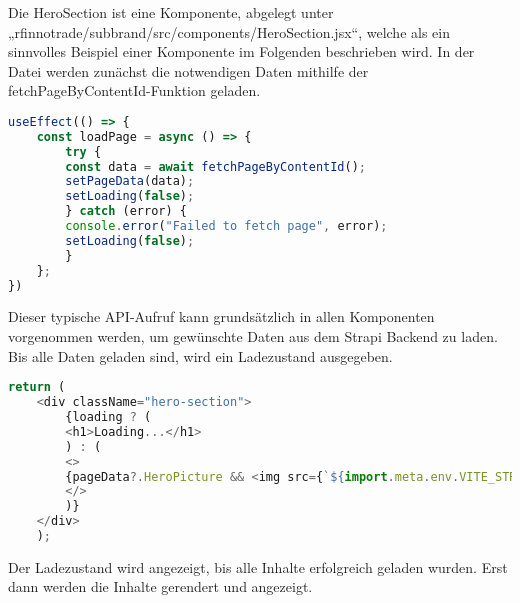 Die HeroSection ist eine Komponente, abgelegt unter „rfinnotrade/subbrand/src/components/HeroSection.jsx“, welche als ein sinnvolles Beispiel einer Komponente im Folgenden beschrieben wird.
In der Datei werden zunächst die notwendigen Daten mithilfe der fetchPageByContentId-Funktion geladen.

\begin{lstlisting}[language=JavaScript, caption={HeroSection.jsx}, label={lst:herosectionjsx}]
useEffect(() => {
    const loadPage = async () => {
        try {
        const data = await fetchPageByContentId();
        setPageData(data);
        setLoading(false);
        } catch (error) {
        console.error("Failed to fetch page", error);
        setLoading(false);
        }
    };
})
\end{lstlisting}

Dieser typische API-Aufruf kann grundsätzlich in allen Komponenten vorgenommen werden, um gewünschte Daten aus dem Strapi Backend zu laden.
Bis alle Daten geladen sind, wird ein Ladezustand ausgegeben.

\begin{lstlisting}[language=JavaScript, caption={HeroSection.jsx}, label={lst:herosectionjsx}]
return (
    <div className="hero-section">
        {loading ? (
        <h1>Loading...</h1>
        ) : (
        <>
        {pageData?.HeroPicture && <img src={`${import.meta.env.VITE_STRAPI_BASE_URL}${pageData?.HeroPicture?.url}`} alt="HeaderBild" className="hero-image" />}
        </>
        )} 
    </div>
    );
\end{lstlisting}

Der Ladezustand wird angezeigt, bis alle Inhalte erfolgreich geladen wurden. Erst dann werden die Inhalte gerendert und angezeigt.